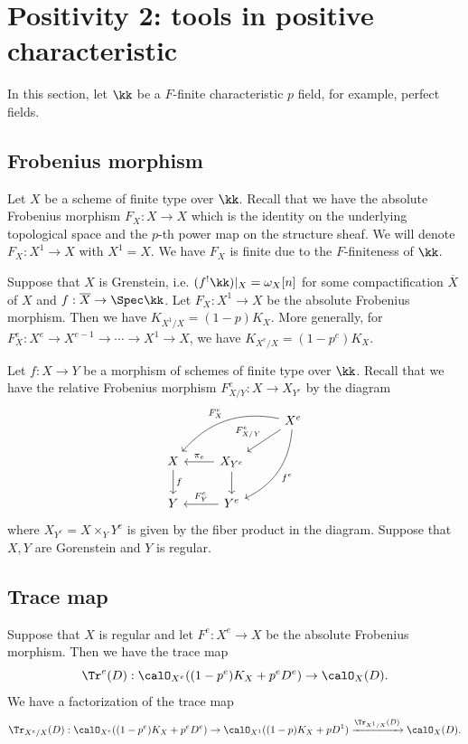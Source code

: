 \section{Positivity 2: tools in positive characteristic}

In this section, let $\kk$ be a $F$-finite characteristic $p$ field, for example, perfect fields.

\subsection{Frobenius morphism}

Let $X$ be a scheme of finite type over $\kk$.
Recall that we have the absolute Frobenius morphism $F_X:X\to X$ which is the identity on the underlying topological space and the $p$-th power map on the structure sheaf.
We will denote $F_X: X^1 \to X$ with $X^1 = X$.
We have $F_X$ is finite due to the $F$-finiteness of $\kk$.

Suppose that $X$ is Grenstein, i.e. $(f^! \kk)|_X = \omega_X[n]$ for some compactification $\overline{X}$ of $X$ and $f: \overline{X} \to \Spec \kk$.
Let $F_X: X^1 \to X$ be the absolute Frobenius morphism.
Then we have $K_{X^1/X} = (1-p)K_X$.
More generally, for $F_X^e: X^e \to X^{e-1} \to \cdots \to X^1 \to X$, we have $K_{X^e/X} = (1-p^e)K_X$.

Let $f: X \to Y$ be a morphism of schemes of finite type over $\kk$.
Recall that we have the relative Frobenius morphism $F_{X/Y}^e: X \to X_{Y^e}$ by the diagram
\[ \begin{tikzcd}
		& & X^e \arrow[lld, "F_X^e"', bend right] \arrow[ld, "F_{X/Y}^e"'] \arrow[ddl, "f^e", bend left] \\
		X \arrow[d, "f"] & X_{Y^e} \arrow[d] \arrow[l, "\pi_e"']& \\
		Y & Y^e \arrow[l, "F_Y^e"'] &
	\end{tikzcd} \]
where $X_{Y^e} = X \times_Y Y^e$ is given by the fiber product in the diagram.
Suppose that $X,Y$ are Gorenstein and $Y$ is regular.
\Yang{}

\subsection{Trace map}

Suppose that $X$ is regular and let $F^e: X^e \to X$ be the absolute Frobenius morphism.
Then we have the trace map
\[ \Tr^e(D): \calO_{X^e}((1-p^e)K_X+p^eD^e) \to \calO_X(D). \]
We have a factorization of the trace map
\[ \Tr_{X^e/X}(D): \calO_{X^e}((1-p^e)K_X+p^eD^e)  \to \calO_{X^1}((1-p)K_X+pD^1) \xrightarrow{\Tr_{X^1/X}(D)} \calO_X(D). \]
\Yang{}

